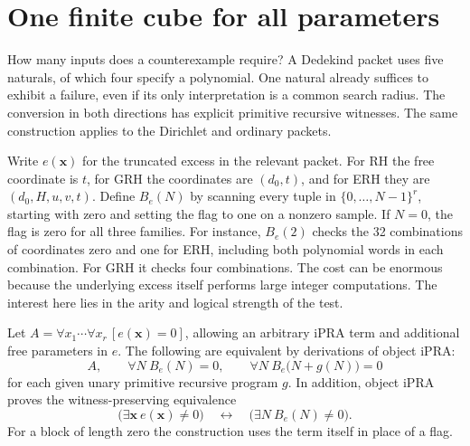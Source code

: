 \section{One finite cube for all parameters}\label{sec:unary-cube}

How many inputs does a counterexample require? A Dedekind packet uses
five naturals, of which four specify a polynomial. One natural already
suffices to exhibit a failure, even if its only interpretation is a
common search radius. The conversion in both directions has explicit
primitive recursive witnesses. The same construction applies to the
Dirichlet and ordinary packets.

Write \(e(\mathbf x)\) for the truncated excess in the relevant
packet. For RH the free coordinate is \(t\), for GRH the coordinates
are \((d_0,t)\), and for ERH they are \((d_0,H,u,v,t)\).
Define \(B_e(N)\) by scanning every tuple in
\(\{0,\ldots,N-1\}^r\), starting with zero and setting the flag to
one on a nonzero sample. If \(N=0\), the flag is zero for all three
families. For instance, \(B_e(2)\) checks the 32 combinations of
coordinates zero and one for ERH, including both polynomial words
in each combination. For GRH it checks four combinations. The cost
can be enormous because the underlying excess itself performs large
integer computations. The interest here lies in the arity and
logical strength of the test.

\begin{theorem}\label{thm:cubef}
Let \(A=\forall x_1\cdots\forall x_r\,[e(\mathbf x)=0]\), allowing
an arbitrary iPRA term and additional free parameters in \(e\).
The following are equivalent by derivations of object iPRA:
\[
 A,\qquad \forall N\ B_e(N)=0,\qquad
 \forall N\ B_e\bigl(N+g(N)\bigr)=0
\]
for each given unary primitive recursive program \(g\). In addition,
object iPRA proves the witness-preserving equivalence
\[
 \bigl(\exists\mathbf x\ e(\mathbf x)\ne0\bigr)
 \quad\longleftrightarrow\quad
 \bigl(\exists N\ B_e(N)\ne0\bigr).
\]
For a block of length zero the construction uses the term itself in
place of a flag.
\end{theorem}

